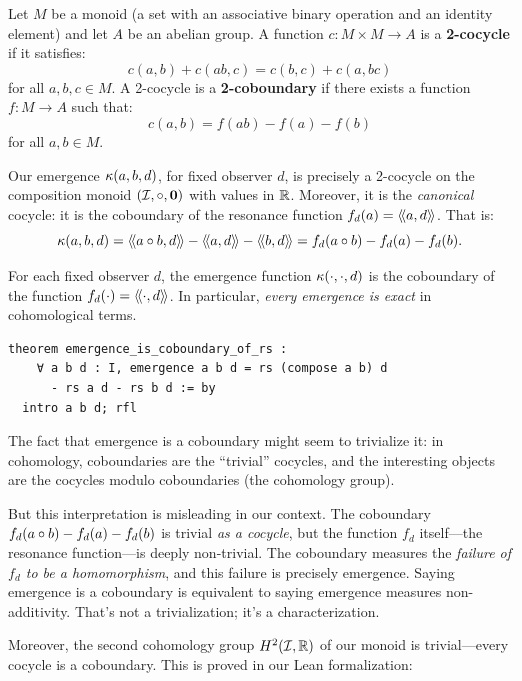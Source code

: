 Let $M$ be a monoid (a set with an associative binary operation and an identity
element) and let $A$ be an abelian group. A function $c : M \times M \to A$ is a
\textbf{2-cocycle} if it satisfies:
\[
  c(a,b) + c(ab, c) = c(b,c) + c(a, bc)
\]
for all $a, b, c \in M$. A 2-cocycle is a \textbf{2-coboundary} if there exists
a function $f : M \to A$ such that:
\[
  c(a,b) = f(ab) - f(a) - f(b)
\]
for all $a, b \in M$.

\begin{remark}
Our emergence $\kappa(a,b,d)$, for fixed observer $d$, is precisely a 2-cocycle
on the composition monoid $(\mathcal{I}, \circ, \mathbf{0})$ with values in $\mathbb{R}$. Moreover,
it is the \emph{canonical} cocycle: it is the coboundary of the resonance function
$f_d(a) = \langle\!\langle a, d \rangle\!\rangle$. That is:
\[
  \kappa(a,b,d) = \langle\!\langle a \circ b, d \rangle\!\rangle - \langle\!\langle a, d \rangle\!\rangle - \langle\!\langle b, d \rangle\!\rangle = f_d(a \circ b) - f_d(a) - f_d(b).
\]
\end{remark}

\begin{theorem}
\label{thm:emergence-coboundary}
For each fixed observer $d$, the emergence function $\kappa(\cdot, \cdot, d)$
is the coboundary of the function $f_d(\cdot) = \langle\!\langle \cdot, d \rangle\!\rangle$. In particular,
\emph{every emergence is exact} in cohomological terms.
\end{theorem}

\begin{lstlisting}[caption={Emergence as coboundary (IDT\_v3\_Emergence.lean)}]
theorem emergence_is_coboundary_of_rs :
    ∀ a b d : I, emergence a b d = rs (compose a b) d
      - rs a d - rs b d := by
  intro a b d; rfl
\end{lstlisting}

\begin{interpretation}
The fact that emergence is a coboundary might seem to trivialize it: in
cohomology, coboundaries are the ``trivial'' cocycles, and the interesting
objects are the cocycles modulo coboundaries (the cohomology group).

But this interpretation is misleading in our context. The coboundary
$f_d(a \circ b) - f_d(a) - f_d(b)$ is trivial \emph{as a cocycle}, but
the function $f_d$ itself---the resonance function---is deeply non-trivial.
The coboundary measures the \emph{failure of $f_d$ to be a homomorphism},
and this failure is precisely emergence. Saying emergence is a coboundary
is equivalent to saying emergence measures non-additivity. That's not a
trivialization; it's a characterization.

Moreover, the second cohomology group $H^2(\mathcal{I}, \mathbb{R})$ of our monoid is
trivial---every cocycle is a coboundary. This is proved in our Lean
formalization:
\end{interpretation}

